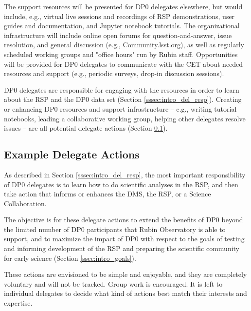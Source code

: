 \documentclass[DM,lsstdraft,authoryear,toc]{lsstdoc}
\begin{document}
The support resources will be presented for DP0 delegates elsewhere, but would include, e.g., virtual live sessions and recordings of RSP demonstrations, user guides and documentation, and Jupyter notebook tutorials.
The organizational infrastructure will include online open forums for question-and-answer, issue resolution, and general discussion (e.g., Community.lsst.org), as well as regularly scheduled working groups and "office hours" run by Rubin staff.
Opportunities will be provided for DP0 delegates to communicate with the CET about needed resources and support (e.g., periodic surveys, drop-in discussion sessions).

DP0 delegates are responsible for engaging with the resources in order to learn about the RSP and the DP0 data set (Section \ref{sssec:intro_del_resp}).
Creating or enhancing DP0 resources and support infrastructure -- e.g., writing tutorial notebooks, leading a collaborative working group, helping other delegates resolve issues -- are all potential delegate actions (Section \ref{ssec:res_act}).

\subsection{Example Delegate Actions}\label{ssec:res_act}

As described in Section \ref{sssec:intro_del_resp}, the most important responsibility of DP0 delegates is to learn how to do scientific analyses in the RSP, and then take action that informs or enhances the DMS, the RSP, or a Science Collaboration. 

The objective is for these delegate actions to extend the benefits of DP0 beyond the limited number of DP0 participants that Rubin Observatory is able to support, and to maximize the impact of DP0 with respect to the goals of testing and informing development of the RSP and preparing the scientific community for early science (Section \ref{ssec:intro_goals}). 

These actions are envisioned to be simple and enjoyable, and they are completely voluntary and will not be tracked.
Group work is encouraged.
It is left to individual delegates to decide what kind of actions best match their interests and expertise. 
\end{document}
